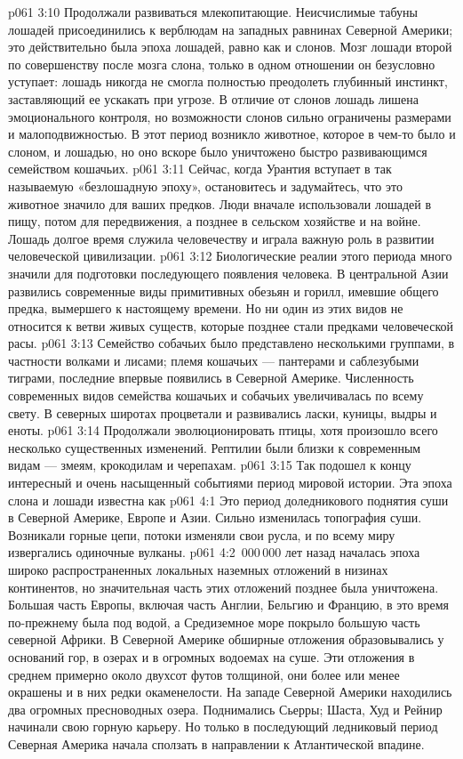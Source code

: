 \vs p061 3:10 Продолжали развиваться млекопитающие. Неисчислимые табуны лошадей присоединились к верблюдам на западных равнинах Северной Америки; это действительно была эпоха лошадей, равно как и слонов. Мозг лошади второй по совершенству после мозга слона, только в одном отношении он безусловно уступает: лошадь никогда не смогла полностью преодолеть глубинный инстинкт, заставляющий ее ускакать при угрозе. В отличие от слонов лошадь лишена эмоционального контроля, но возможности слонов сильно ограничены размерами и малоподвижностью. В этот период возникло животное, которое в чем\hyp{}то было и слоном, и лошадью, но оно вскоре было уничтожено быстро развивающимся семейством кошачьих.
\vs p061 3:11 \pc Сейчас, когда Урантия вступает в так называемую «безлошадную эпоху», остановитесь и задумайтесь, что это животное значило для ваших предков. Люди вначале использовали лошадей в пищу, потом для передвижения, а позднее в сельском хозяйстве и на войне. Лошадь долгое время служила человечеству и играла важную роль в развитии человеческой цивилизации.
\vs p061 3:12 \pc Биологические реалии этого периода много значили для подготовки последующего появления человека. В центральной Азии развились современные виды примитивных обезьян и горилл, имевшие общего предка, вымершего к настоящему времени. Но ни один из этих видов не относится к ветви живых существ, которые позднее стали предками человеческой расы.
\vs p061 3:13 Семейство собачьих было представлено несколькими группами, в частности волками и лисами; племя кошачьих --- пантерами и саблезубыми тиграми, последние впервые появились в Северной Америке. Численность современных видов семейства кошачьих и собачьих увеличивалась по всему свету. В северных широтах процветали и развивались ласки, куницы, выдры и еноты.
\vs p061 3:14 Продолжали эволюционировать птицы, хотя произошло всего несколько существенных изменений. Рептилии были близки к современным видам --- змеям, крокодилам и черепахам.
\vs p061 3:15 \pc Так подошел к концу интересный и очень насыщенный событиями период мировой истории. Эта эпоха слона и лошади известна как 
\vs p061 4:1 Это период доледникового поднятия суши в Северной Америке, Европе и Азии. Сильно изменилась топография суши. Возникали горные цепи, потоки изменяли свои русла, и по всему миру извергались одиночные вулканы.
\vs p061 4:2 \,000\,000 лет назад началась эпоха широко распространенных локальных наземных отложений в низинах континентов, но значительная часть этих отложений позднее была уничтожена. Большая часть Европы, включая часть Англии, Бельгию и Францию, в это время по\hyp{}прежнему была под водой, а Средиземное море покрыло большую часть северной Африки. В Северной Америке обширные отложения образовывались у оснований гор, в озерах и в огромных водоемах на суше. Эти отложения в среднем примерно около двухсот футов толщиной, они более или менее окрашены и в них редки окаменелости. На западе Северной Америки находились два огромных пресноводных озера. Поднимались Сьерры; Шаста, Худ и Рейнир начинали свою горную карьеру. Но только в последующий ледниковый период Северная Америка начала сползать в направлении к Атлантической впадине.
